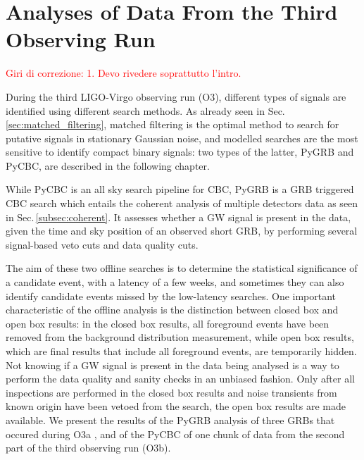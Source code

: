 \documentclass[binding=0.6cm, LaM]{sapthesis}
\newcommand{\fpg}[1]{\textcolor{red}{#1} }
\begin{document}
\chapter{Analyses of Data From the Third Observing Run}
\label{ch:datanalysis}
\fpg{Giri di correzione: 1. Devo rivedere soprattutto l'intro.}%

During the third LIGO-Virgo observing run (O3),
	different types of signals are identified using different search methods.
	As already seen in Sec.\ref{sec:matched_filtering}, matched filtering is the optimal method 
	to search for putative signals in stationary Gaussian noise,
	and modelled searches are the most sensitive to identify compact binary signals:
	two types of the latter, {\ttfamily PyGRB} and {\ttfamily PyCBC}, 
	are described in the following chapter.

	While {\ttfamily PyCBC} is an all sky search pipeline for CBC,
	{\ttfamily PyGRB} is a GRB triggered CBC search
        which entails the coherent analysis of multiple detectors data as seen in Sec.\,\ref{subsec:coherent}.
        It assesses whether a GW signal is present in the data,
        given the time and sky position of an observed short GRB,
        by performing several signal-based veto cuts and data quality cuts.

	The aim of these two offline searches is to determine the statistical significance of a candidate event,
	with a latency of a few weeks, and sometimes they can also identify candidate events missed by the low-latency searches. 
	One important characteristic of the offline analysis is the distinction between closed box and open box results:
	in the closed box results, all foreground events have been removed from the background distribution measurement,
	while open box results, which are final results that include all foreground events, are temporarily hidden. 
	Not knowing if a GW signal is present in the data being analysed is a way to perform the data quality and sanity checks in an unbiased fashion.
	Only after all inspections are performed in the closed box results and 
	noise transients from known origin have been vetoed from the search, 
	the open box results are made available. 	
	We present the results of the {\ttfamily PyGRB} analysis of three GRBs that occured during O3a \cite{43}, and
        of the {\ttfamily PyCBC} of one chunk of data from the second part of the third observing run (O3b).
\end{document}
